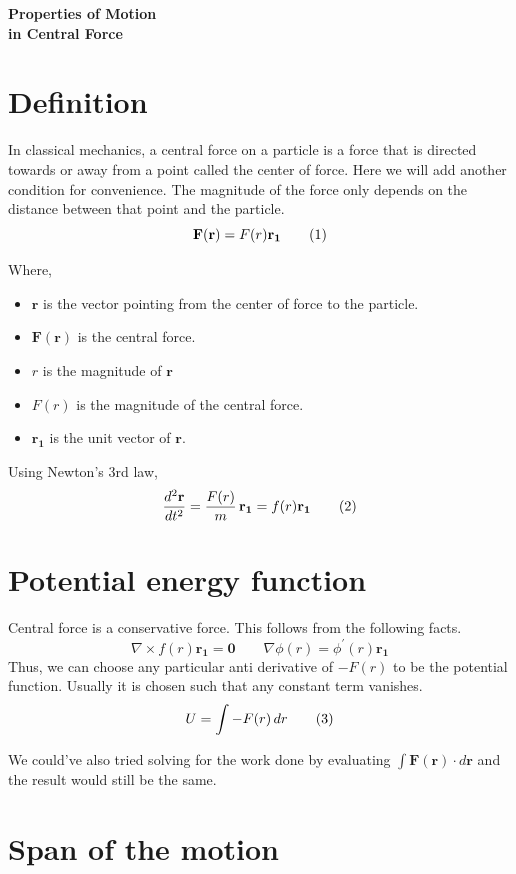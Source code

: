 \documentclass[a4paper, 12pt]{article}
\renewcommand{\indent}{\hspace{3ex}}
\newcommand\labelthis[1]{\addtocounter{equation}{1}\tag{\theequation}\label{#1}}
\renewcommand{\maketitle}{
	\begin{center}
		\huge\bfseries{Properties of Motion\\in Central Force}
	\end{center}
	\bigskip
}
\renewcommand{\r}{\mathbf{r}}
\newcommand{\ru}{\mathbf{r_1}}
\renewcommand{\vec}[1]{\mathbf{#1}}
\newcommand{\ddtII}[1]{\frac{d^2#1}{dt^2}}
\begin{document}
\maketitle

\section{Definition}\label{definition}

\indent In classical mechanics, a central force on a particle is a force that is directed towards or away from a point called the center of force. Here we will add another condition for convenience. The magnitude of the force only depends on the distance between that point and the particle.
\[ \vec{F}(\r) = F(r) \ru \labelthis{eq:def central force} \]

Where,
\begin{itemize}
	\item $\r$ is the vector pointing from the center of force to the particle.
	\item $\vec{F}(\r)$ is the central force.
	\item $r$ is the magnitude of $\r$
	\item $F(r)$ is the magnitude of the central force.
	\item $\ru$ is the unit vector of $\r$.
\end{itemize}

Using Newton's 3rd law,
\[ \ddtII{\r} = \frac{F(r)}{m} \, \ru = f(r) \ru \labelthis{eq:def central acceleration} \]

\section{Potential energy function}\label{potential energy}

Central force is a conservative force. This follows from the following facts.
\[ \nabla \times f(r) \ru = \mathbf{0} \hspace{2em} \nabla \phi(r) = \phi^{'}(r) \ru \]
Thus, we can choose any particular anti derivative of $- F(r)$ to be the potential function. Usually it is chosen such that any constant term vanishes.
\[ U = \int - F(r) \, dr \labelthis{eq:potential energy} \]

We could've also tried solving for the work done by evaluating $\int \vec{F}(\r) \cdot d\r$ and the result would still be the same.

\section{Span of the motion}\label{span of motion}
\end{document}
